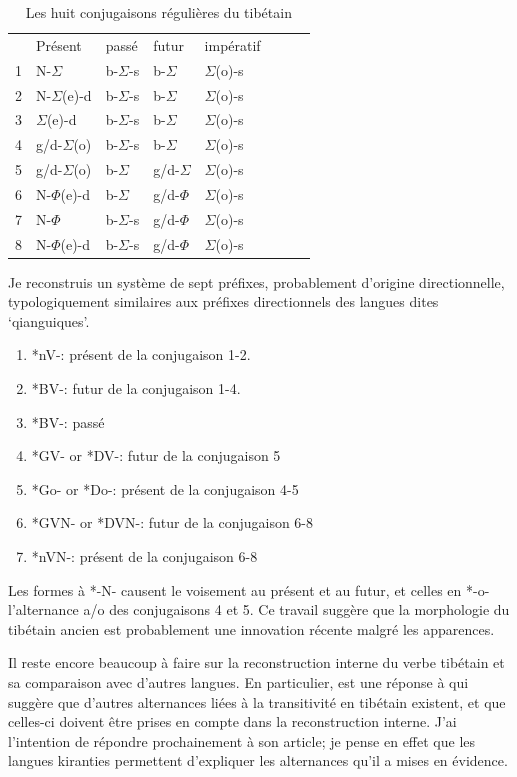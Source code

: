 \documentclass[oldfontcommands,oneside,a4paper,11pt]{memoir}
\newcommand{\sig}{\begin{math}\Sigma\end{math}}
\newcommand{\phone}{\begin{math}\Phi\end{math}}
\begin{document}
\begin{table}[H]
\caption{Les huit conjugaisons régulières du tibétain } 
\begin{tabular}{llllllll} 
 	&	Présent	&	passé	&	futur	&	impératif	\\
1	&	N-\sig{}	&	b-\sig{}-s	&	b-\sig{}	&	\sig{}(o)-s	\\
2	&	N-\sig{}(e)-d	&	b-\sig{}-s	&	b-\sig{}	&	\sig{}(o)-s	\\
3	&	\sig{}(e)-d	&	b-\sig{}-s	&	b-\sig{}	&	\sig{}(o)-s	\\
4	&	g/d-\sig{}(o)	&	b-\sig{}-s	&	b-\sig{}	&	\sig{}(o)-s	\\
5	&	g/d-\sig{}(o)	&	b-\sig{}	&	g/d-\sig{}	&	\sig{}(o)-s	\\
6	&	N-\phone(e)-d	&	b-\sig{}	&	g/d-\phone{}	&	\sig{}(o)-s	\\
7	&	N-\phone	&	b-\sig{}-s	&	g/d-\phone{}	&	\sig{}(o)-s	\\
8	&	N-\phone(e)-d	&	b-\sig{}-s	&	g/d-\phone{}	&	\sig{}(o)-s	\\
\end{tabular}
\end{table}

Je reconstruis un système de sept préfixes, probablement d'origine directionnelle, typologiquement similaires aux préfixes directionnels des langues dites `qianguiques'.

\begin{enumerate}

\item *nV-: présent de la conjugaison 1-2.
\item *BV-: futur de  la   conjugaison 1-4.
\item *BV-: passé
\item *GV- or *DV-: futur de  la   conjugaison 5
\item *Go- or *Do-: présent de la conjugaison 4-5
\item *GVN- or *DVN-: futur de  la   conjugaison 6-8
\item *nVN-:  présent de la conjugaison 6-8
\end{enumerate}
Les formes à *-N- causent le voisement au présent et au futur, et celles en *-o- l'alternance a/o des conjugaisons 4 et 5. Ce travail suggère que la morphologie du tibétain ancien est probablement une innovation récente malgré les apparences. 

Il reste encore beaucoup à faire sur la reconstruction interne du verbe tibétain et sa comparaison avec d'autres langues. En particulier,  \citet{hill14voicing} est une réponse à \citet{jacques12internal} qui suggère que d'autres alternances liées à la transitivité en tibétain existent, et que celles-ci doivent être prises en compte dans la reconstruction interne.  J'ai l'intention de répondre prochainement à son article; je pense en effet que les langues kiranties permettent d'expliquer les alternances qu'il  a mises en évidence.
\end{document}
